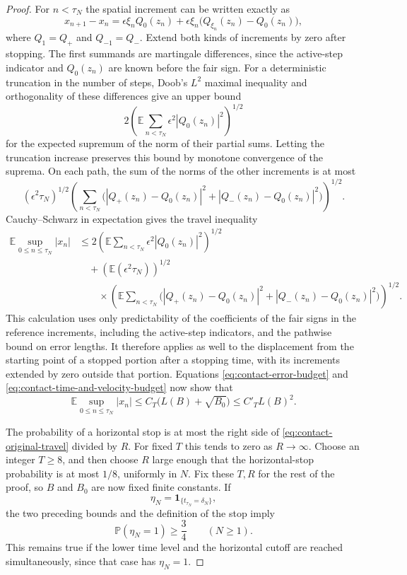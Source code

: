 \documentclass[11pt]{article}
\numberwithin{equation}{section}
\theoremstyle{definition}
\theoremstyle{remark}
\begin{document}
\begin{proof}
For $n<\tau_N$ the spatial increment can be written exactly as
\[
  x_{n+1}-x_n
   =\epsilon\xi_n Q_0(z_n)
     +\epsilon\xi_n\bigl(Q_{\xi_n}(z_n)-Q_0(z_n)\bigr),
\]
where $Q_{1}=Q_+$ and $Q_{-1}=Q_-$.  Extend both kinds of increments by
zero after stopping.  The first summands are martingale differences, since
the active-step indicator and $Q_0(z_n)$ are known before the fair sign.
For a deterministic truncation in the number of steps, Doob's $L^2$ maximal
inequality and
orthogonality of these differences give an upper bound
\[
  2\left(\mathbb E\sum_{n<\tau_N}\epsilon^2|Q_0(z_n)|^2\right)^{1/2}
\]
for the expected supremum of the norm of their partial sums.  Letting the
truncation increase preserves this bound by monotone convergence of the
suprema.  On each path, the sum of the norms of the other increments is at
most
\[
  (\epsilon^2\tau_N)^{1/2}
  \left(\sum_{n<\tau_N}
       \bigl(|Q_+(z_n)-Q_0(z_n)|^2+|Q_-(z_n)-Q_0(z_n)|^2\bigr)\right)^{1/2}.
\]
Cauchy--Schwarz in expectation gives the travel inequality
\begin{equation}\label{eq:contact-travel-inequality}
\begin{split}
  \mathbb E\sup_{0\le n\le\tau_N}|x_n|
  &\le 2\left(\mathbb E\sum_{n<\tau_N}
                    \epsilon^2|Q_0(z_n)|^2\right)^{1/2}\\
  &\quad+\left(\mathbb E(\epsilon^2\tau_N)\right)^{1/2}\\
  &\qquad\times\left(\mathbb E\sum_{n<\tau_N}
       \bigl(|Q_+(z_n)-Q_0(z_n)|^2+|Q_-(z_n)-Q_0(z_n)|^2\bigr)\right)^{1/2}.
\end{split}
\end{equation}
This calculation uses only predictability of the coefficients of the fair
signs in the reference increments, including the active-step indicators,
and the pathwise bound on error lengths.  It therefore applies as well to
the displacement from the starting point of a stopped portion after a stopping
time, with its increments extended by zero outside that portion.  Equations \eqref{eq:contact-error-budget} and
\eqref{eq:contact-time-and-velocity-budget} now show that
\begin{equation}\label{eq:contact-original-travel}
  \mathbb E\sup_{0\le n\le\tau_N}|x_n|
    \le C_T\bigl(L(B)+\sqrt{B_0}\bigr)
    \le C'_T L(B)^2.
\end{equation}

The probability of a horizontal stop is at most the right side of
\eqref{eq:contact-original-travel} divided by $R$. For fixed $T$ this tends
to zero as $R\to\infty$. Choose an integer $T\ge8$, and then choose $R$
large enough that
the horizontal-stop probability is at most $1/8$, uniformly in $N$.
Fix these $T,R$ for the rest of the proof, so $B$ and $B_0$ are now fixed
finite constants.  If
\[
  \eta_N=\mathbf1_{\{t_{\tau_N}=\delta_N\}},
\]
the two preceding bounds and the definition of the stop imply
\begin{equation}\label{eq:contact-lower-hit-probability}
  \mathbb P(\eta_N=1)\ge\frac34\qquad(N\ge1).
\end{equation}
This remains true if the lower time level and the horizontal cutoff are
reached simultaneously, since that case has $\eta_N=1$.


\end{proof}
\end{document}
